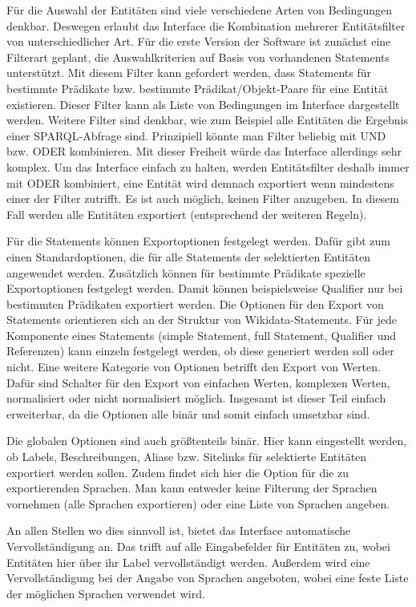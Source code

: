 Für die Auswahl der Entitäten sind viele verschiedene Arten von Bedingungen denkbar.
Deswegen erlaubt das Interface die Kombination mehrerer Entitätsfilter von unterschiedlicher Art.
Für die erste Version der Software ist zunächst eine Filterart geplant, die Auswahlkriterien auf Basis von vorhandenen Statements unterstützt. 
Mit diesem Filter kann gefordert werden, dass Statements für bestimmte Prädikate bzw. bestimmte Prädikat/Objekt-Paare für eine Entität existieren.
Dieser Filter kann als Liste von Bedingungen im Interface dargestellt werden.
Weitere Filter sind denkbar, wie zum Beispiel alle Entitäten die Ergebnis einer SPARQL-Abfrage sind.
Prinzipiell könnte man Filter beliebig mit UND bzw. ODER kombinieren.
Mit dieser Freiheit würde das Interface allerdings sehr komplex.
Um das Interface einfach zu halten, werden Entitätsfilter deshalb immer mit ODER kombiniert, eine Entität wird demnach exportiert wenn mindestens einer der Filter zutrifft.
Es ist auch möglich, keinen Filter anzugeben.
In diesem Fall werden alle Entitäten exportiert (entsprechend der weiteren Regeln).

Für die Statements können Exportoptionen festgelegt werden.
Dafür gibt zum einen Standardoptionen, die für alle Statements der selektierten Entitäten angewendet werden.
Zusätzlich können für bestimmte Prädikate spezielle Exportoptionen festgelegt werden.
Damit können beispielsweise Qualifier nur bei bestimmten Prädikaten exportiert werden.
Die Optionen für den Export von Statements orientieren sich an der Struktur von Wikidata-Statements.
Für jede Komponente eines Statements (simple Statement, full Statement, Qualifier und Referenzen) kann einzeln festgelegt werden, ob diese generiert werden soll oder nicht.
Eine weitere Kategorie von Optionen betrifft den Export von Werten.
Dafür sind Schalter für den Export von einfachen Werten, komplexen Werten, normalisiert oder nicht normalisiert möglich.
Insgesamt ist dieser Teil einfach erweiterbar, da die Optionen alle binär und somit einfach umsetzbar sind.

Die globalen Optionen sind auch größtenteils binär.
Hier kann eingestellt werden, ob Labels, Beschreibungen, Aliase bzw. Sitelinks für selektierte Entitäten exportiert werden sollen.
Zudem findet sich hier die Option für die zu exportierenden Sprachen.
Man kann entweder keine Filterung der Sprachen vornehmen (alle Sprachen exportieren) oder eine Liste von Sprachen angeben.

An allen Stellen wo dies sinnvoll ist, bietet das Interface automatische Vervollständigung an.
Das trifft auf alle Eingabefelder für Entitäten zu, wobei Entitäten hier über ihr Label vervollständigt werden.
Außerdem wird eine Vervollständigung bei der Angabe von Sprachen angeboten, wobei eine feste Liste der möglichen Sprachen verwendet wird.

